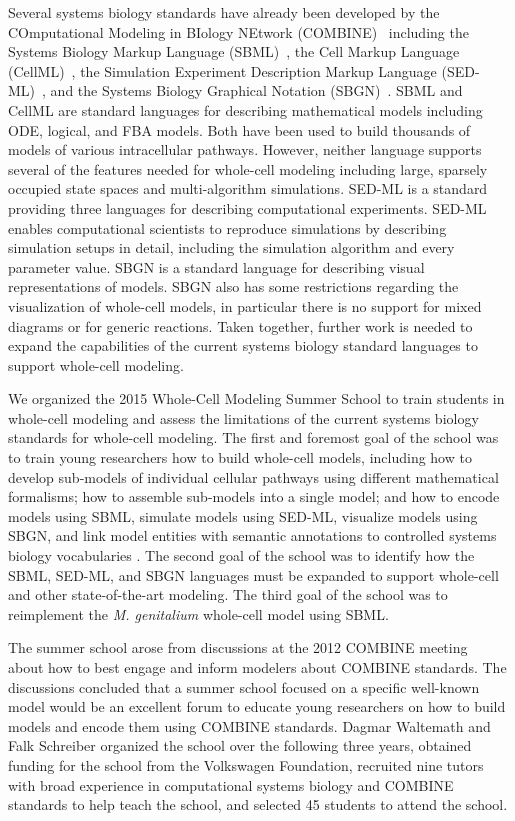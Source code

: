 \documentclass[journal,transmag]{IEEEtran}
\begin{document}
Several systems biology standards have already been developed by the COmputational Modeling in BIology NEtwork (COMBINE)~\cite{le2011meeting} including the Systems Biology Markup Language (SBML)~\cite{hucka2003}, the Cell Markup Language (CellML)~\cite{hedley_2001b}, the Simulation Experiment Description Markup Language (SED-ML)~\cite{sedml2011}, and the Systems Biology Graphical Notation (SBGN)~\cite{LeNovereHMMSS09}. SBML and CellML are standard languages for describing mathematical models including ODE, logical, and FBA models. Both have been used to build thousands of models of various intracellular pathways. 
However, neither language supports several of the features needed for whole-cell modeling including large, sparsely occupied state spaces and multi-algorithm simulations. 
SED-ML is a standard providing three languages for describing computational experiments. SED-ML enables computational scientists to reproduce simulations by describing simulation setups in detail, including the simulation algorithm and every parameter value. 
SBGN is a standard language for describing visual representations of models. SBGN also has some restrictions regarding the visualization of whole-cell models, in particular there is no support for mixed diagrams or for generic reactions.
Taken together, further work is needed to expand the capabilities of the current systems biology standard languages to support whole-cell modeling.

We organized the 2015 Whole-Cell Modeling Summer School to train students in whole-cell modeling and assess the limitations of the current systems biology standards for whole-cell modeling. 
The first and foremost goal of the school was to train young researchers how to build whole-cell models, including how to develop sub-models of individual cellular pathways using different mathematical formalisms; how to assemble sub-models into a single model; and how to encode models using SBML, simulate models using SED-ML, visualize models using SBGN, and link model entities with semantic annotations to controlled systems biology vocabularies \cite{courtot2011a}. 
The second goal of the school was to identify how the SBML, SED-ML, and SBGN languages must be expanded to support whole-cell and other state-of-the-art modeling.
The third goal of the school was to reimplement the \textit{M. genitalium} whole-cell model using SBML.

The summer school arose from discussions at the 2012 COMBINE meeting~\cite{COMBINE2012} about how to best engage and inform modelers about COMBINE standards. The discussions concluded that a summer school focused on a specific well-known model would be an excellent forum to educate young researchers on how to build models and encode them using COMBINE standards. Dagmar Waltemath and Falk Schreiber organized the school over the following three years, obtained funding for the school from the Volkswagen Foundation, recruited nine tutors with broad experience in computational systems biology and COMBINE standards to help teach the school, and selected 45 students to attend the school.
\end{document}
